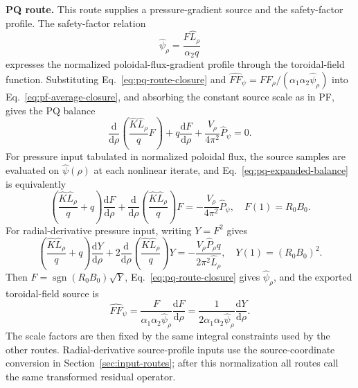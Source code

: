 \documentclass[final, 3p, times]{elsarticle}
\newcommand{\routeclosure}[1]{\par\medskip\noindent\textbf{#1.}\quad}
\begin{document}
\routeclosure{PQ route}
This route supplies a pressure-gradient source and the safety-factor profile. The safety-factor relation
\begin{equation}
    \hat{\psi}_\rho
    =\frac{F\hat{L}_\rho}{\alpha_2 q}
    \label{eq:pq-route-closure}
\end{equation}
expresses the normalized poloidal-flux-gradient profile through the toroidal-field function. Substituting Eq.~\eqref{eq:pq-route-closure} and
$\hat{FF}_\psi=F F_\rho/(\alpha_1\alpha_2\hat{\psi}_\rho)$ into Eq.~\eqref{eq:pf-average-closure}, and absorbing the constant source scale as in PF, gives the PQ balance
\begin{equation}
    \frac{\mathrm{d}}{\mathrm{d}\rho}
    \left(\frac{\hat{K}\hat{L}_\rho}{q}F\right)
    +q\frac{\mathrm{d}F}{\mathrm{d}\rho}
    +\frac{V_\rho}{4\pi^2}\hat{P}_\psi=0 .
    \label{eq:pq-expanded-balance}
\end{equation}
For pressure input tabulated in normalized poloidal flux, the source samples are evaluated on $\hat{\psi}(\rho)$ at each nonlinear iterate, and Eq.~\eqref{eq:pq-expanded-balance} is equivalently
\begin{equation*}
    \left(\frac{\hat{K}\hat{L}_\rho}{q}+q\right)
    \frac{\mathrm{d}F}{\mathrm{d}\rho}
    +\frac{\mathrm{d}}{\mathrm{d}\rho}
    \left(\frac{\hat{K}\hat{L}_\rho}{q}\right)F
    =-\frac{V_\rho}{4\pi^2}\hat{P}_\psi,
    \quad F(1)=R_0B_0 .
\end{equation*}
For radial-derivative pressure input, writing $Y=F^2$ gives
\begin{equation*}
    \left(\frac{\hat{K}\hat{L}_\rho}{q}+q\right)
    \frac{\mathrm{d}Y}{\mathrm{d}\rho}
    +2\frac{\mathrm{d}}{\mathrm{d}\rho}
    \left(\frac{\hat{K}\hat{L}_\rho}{q}\right)Y
    =-\frac{V_\rho \hat{P}_\rho q}{2\pi^2\hat{L}_\rho},
    \quad Y(1)=(R_0B_0)^2 .
\end{equation*}
Then $F=\operatorname{sgn}(R_0B_0)\sqrt{Y}$, Eq.~\eqref{eq:pq-route-closure} gives $\hat{\psi}_\rho$, and the exported toroidal-field source is
\begin{equation}
    \hat{FF}_\psi
    =\frac{F}{\alpha_1\alpha_2\hat{\psi}_\rho}
    \frac{\mathrm{d}F}{\mathrm{d}\rho}
    =\frac{1}{2\alpha_1\alpha_2\hat{\psi}_\rho}
    \frac{\mathrm{d}Y}{\mathrm{d}\rho} .
\end{equation}
The scale factors are then fixed by the same integral constraints used by the other routes. Radial-derivative source-profile inputs use the source-coordinate conversion in Section~\ref{sec:input-routes}; after this normalization all routes call the same transformed residual operator.
\end{document}
